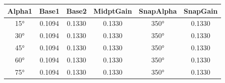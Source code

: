 \begin{table}[h]
\centering
\begin{tabular}{ |c|c|c|c|c|c| }
\hline
Alpha1 & Base1 & Base2 & MidptGain & SnapAlpha & SnapGain \\
\hline
15° & 0.1094 & 0.1330 & 0.1330 & 350° & 0.1330 \\
\hline
30° & 0.1094 & 0.1330 & 0.1330 & 350° & 0.1330 \\
\hline
45° & 0.1094 & 0.1330 & 0.1330 & 350° & 0.1330 \\
\hline
60° & 0.1094 & 0.1330 & 0.1330 & 350° & 0.1330 \\
\hline
75° & 0.1094 & 0.1330 & 0.1330 & 350° & 0.1330 \\
\hline
\end{tabular}
\end{table}
